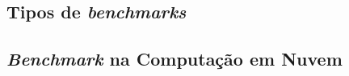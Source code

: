 \subsection{Tipos de \textit{benchmarks}}






\subsection{\textit{Benchmark} na Computação em Nuvem}

